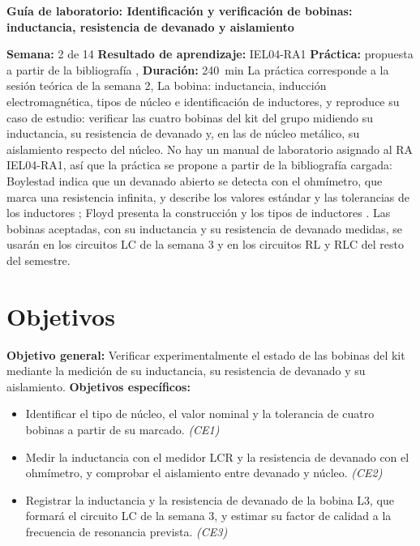 \documentclass[12pt]{article}
\begin{document}
\nocite{ref1,ref2,ext1}

\datosguia
\lineablanco

{\centering\bfseries Guía de laboratorio: Identificación y verificación de bobinas: inductancia, resistencia de devanado y aislamiento\par}
\lineablanco
\textbf{Semana:} 2 de 14 \quad \textbf{Resultado de aprendizaje:} IEL04-RA1 \quad \textbf{Práctica:} propuesta a partir de la bibliografía \cite{ref1}, \cite{ref2} \quad \textbf{Duración:} \SI{240}{\minute}
\lineablanco
La práctica corresponde a la sesión teórica de la semana 2, \guillemotleft{}La bobina: inductancia, inducción electromagnética, tipos de núcleo e identificación de inductores\guillemotright{}, y reproduce su caso de estudio: verificar las cuatro bobinas del kit del grupo midiendo su inductancia, su resistencia de devanado y, en las de núcleo metálico, su aislamiento respecto del núcleo. No hay un manual de laboratorio asignado al RA IEL04-RA1, así que la práctica se propone a partir de la bibliografía cargada: Boylestad indica que un devanado abierto se detecta con el ohmímetro, que marca una resistencia infinita, y describe los valores estándar y las tolerancias de los inductores \cite{ref2}; Floyd presenta la construcción y los tipos de inductores \cite{ref1}. Las bobinas aceptadas, con su inductancia y su resistencia de devanado medidas, se usarán en los circuitos LC de la semana 3 y en los circuitos RL y RLC del resto del semestre.

\section{Objetivos}\label{sec:objetivos}
\textbf{Objetivo general:} Verificar experimentalmente el estado de las bobinas del kit mediante la medición de su inductancia, su resistencia de devanado y su aislamiento.
\lineablanco
\textbf{Objetivos específicos:}
\begin{itemize}
  \item Identificar el tipo de núcleo, el valor nominal y la tolerancia de cuatro bobinas a partir de su marcado. \emph{(CE1)}
  \item Medir la inductancia con el medidor LCR y la resistencia de devanado con el ohmímetro, y comprobar el aislamiento entre devanado y núcleo. \emph{(CE2)}
  \item Registrar la inductancia y la resistencia de devanado de la bobina L3, que formará el circuito LC de la semana 3, y estimar su factor de calidad a la frecuencia de resonancia prevista. \emph{(CE3)}
\end{itemize}
\end{document}
